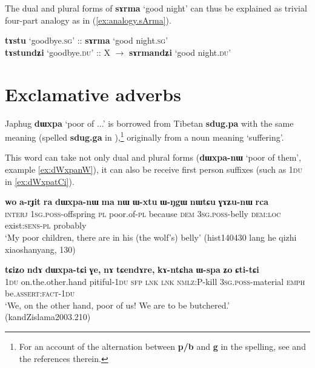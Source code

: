 \documentclass[11pt]{article}
\newcommand{\ipa}[1]{{\phon\textbf{#1}}}
\newcommand{\refb}[1]{(\ref{#1})}
\begin{document}
The dual and plural forms of \ipa{sɤrma} `good night' can thus be explained as trivial four-part analogy as in \refb{ex:analogy.sArma}.

\begin{exe}
\ex \label{ex:analogy.sArma}
\gll
\ipa{tɤstu} `goodbye.\textsc{sg}' :: {\ipa{sɤrma} `good night.\textsc{sg}'} \\
\ipa{tɤstundʑi} `goodbye.\textsc{du}' :: {X $\rightarrow$ \ipa{sɤrmandʑi} `good night.\textsc{du}'} \\
\end{exe}

\section{Exclamative adverbs}
Japhug \ipa{dɯxpa} `poor of ...' is borrowed from Tibetan \ipa{sdug.pa} with the same meaning (spelled \ipa{sdug.ga} in \citealt{bodrgya}),\footnote{For an account of the alternation between \ipa{p/b} and \ipa{g} in the spelling, see \citet{hill11hb} and the references therein.} originally from a noun meaning `suffering'.

This word can take not only dual and plural forms (\ipa{dɯxpa-nɯ} `poor of them', example \ref{ex:dWxpanW}), it can also be receive first person suffixes (such as \textsc{1du} in \ref{ex:dWxpatCi}).

\begin{exe}
\ex \label{ex:dWxpanW}
\gll
\ipa{wo} 	\ipa{a-rɟit} 	\ipa{ra} 	\ipa{dɯxpa-nɯ} 	\ipa{ma} 	\ipa{nɯ} 	\ipa{ɯ-xtu} 	\ipa{ɯ-ŋgɯ} 	\ipa{nɯtɕu} 	\ipa{ɣɤʑu-nɯ} 	\ipa{rca}  \\
\textsc{interj} \textsc{1sg.poss}-offspring \textsc{pl} poor.of-\textsc{pl} because \textsc{dem} \textsc{3sg.poss}-belly  \textsc{dem:loc}  exist:\textsc{sens-pl} probably \\
\glt `My poor children, there are in his (the wolf's) belly' (hist140430 lang he qizhi xiaoshanyang, 130)
\end{exe}

\begin{exe}
\ex \label{ex:dWxpatCi}
\gll
\ipa{tɕiʑo} 	\ipa{ndɤ} 	\ipa{dɯxpa-tɕi} 	\ipa{ɣe,} 	\ipa{nɤ} 	\ipa{tɕendɤre,} 	\ipa{kɤ-ntɕha} 	\ipa{ɯ-spa} 	\ipa{ʑo} 	\ipa{ɕti-tɕi}  \\
\textsc{1du} on.the.other.hand pitiful-\textsc{1du} \textsc{sfp} \textsc{lnk} \textsc{lnk} \textsc{nmlz}:P-kill \textsc{3sg.poss}-material \textsc{emph} be.\textsc{assert:fact-1du} \\
\glt `We, on the other hand, poor of us! We are to be butchered.' (kandZislama2003.210)
\end{exe}
\end{document}

